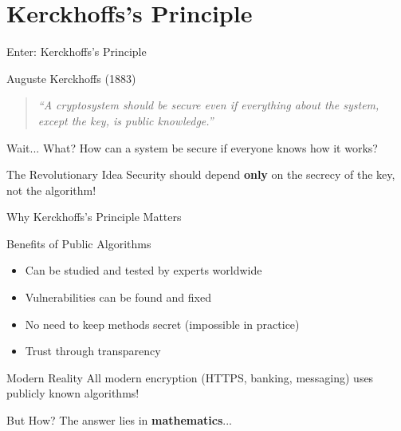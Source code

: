 \documentclass{beamer}
\begin{document}
\section{Kerckhoffs's Principle}

\begin{frame}{Enter: Kerckhoffs's Principle}
\begin{block}{Auguste Kerckhoffs (1883)}
\begin{quote}
\textit{``A cryptosystem should be secure even if everything about the system, except the key, is public knowledge.''}
\end{quote}
\end{block}

\pause

\begin{alertblock}{Wait... What?}
How can a system be secure if everyone knows how it works?
\end{alertblock}

\pause

\begin{block}{The Revolutionary Idea}
Security should depend \textbf{only} on the secrecy of the key, not the algorithm!
\end{block}
\end{frame}

\begin{frame}{Why Kerckhoffs's Principle Matters}
\begin{block}{Benefits of Public Algorithms}
\begin{itemize}
    \item Can be studied and tested by experts worldwide
    \item Vulnerabilities can be found and fixed
    \item No need to keep methods secret (impossible in practice)
    \item Trust through transparency
\end{itemize}
\end{block}

\pause

\begin{exampleblock}{Modern Reality}
All modern encryption (HTTPS, banking, messaging) uses publicly known algorithms!
\end{exampleblock}

\pause

\begin{alertblock}{But How?}
The answer lies in \textbf{mathematics}...
\end{alertblock}
\end{frame}
\end{document}
